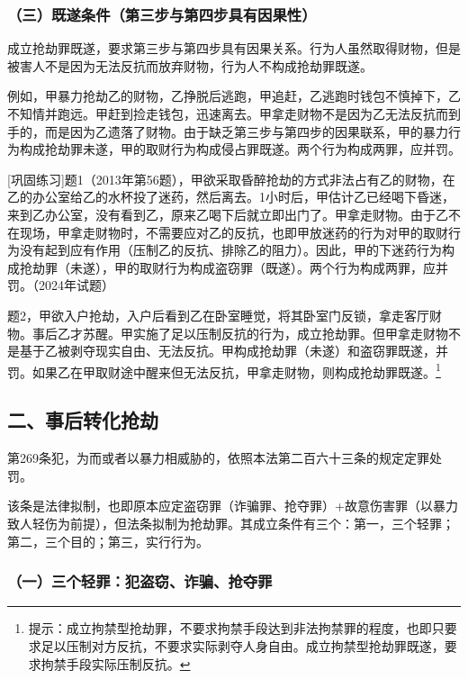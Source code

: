 \subsubsection*{（三）既遂条件（第三步与第四步具有因果性）}

成立抢劫罪既遂，要求第三步与第四步具有因果关系。行为人虽然取得财物，但是被害人不是因为无法反抗而放弃财物，行为人不构成抢劫罪既遂。

例如，甲暴力抢劫乙的财物，乙挣脱后逃跑，甲追赶，乙逃跑时钱包不慎掉下，乙不知情并跑远。甲赶到捡走钱包，迅速离去。甲拿走财物不是因为乙无法反抗而到手的，而是因为乙遗落了财物。由于缺乏第三步与第四步的因果联系，甲的暴力行为构成抢劫罪未遂，甲的取财行为构成侵占罪既遂。两个行为构成两罪，应并罚。

[巩固练习]题1（2013年第56题），甲欲采取昏醉抢劫的方式非法占有乙的财物，在乙的办公室给乙的水杯投了迷药，然后离去。1小时后，甲估计乙已经喝下昏迷，来到乙办公室，没有看到乙，原来乙喝下后就立即出门了。甲拿走财物。由于乙不在现场，甲拿走财物时，不需要应对乙的反抗，也即甲放迷药的行为对甲的取财行为没有起到应有作用（压制乙的反抗、排除乙的阻力）。因此，甲的下迷药行为构成抢劫罪（未遂），甲的取财行为构成盗窃罪（既遂）。两个行为构成两罪，应并罚。（2024年试题）

题2，甲欲入户抢劫，入户后看到乙在卧室睡觉，将其卧室门反锁，拿走客厅财物。事后乙才苏醒。甲实施了足以压制反抗的行为，成立抢劫罪。但甲拿走财物不是基于乙被剥夺现实自由、无法反抗。甲构成抢劫罪（未遂）和盗窃罪既遂，并罚。如果乙在甲取财途中醒来但无法反抗，甲拿走财物，则构成抢劫罪既遂。\footnote{提示：成立拘禁型抢劫罪，不要求拘禁手段达到非法拘禁罪的程度，也即只要求足以压制对方反抗，不要求实际剥夺人身自由。成立拘禁型抢劫罪既遂，要求拘禁手段实际压制反抗。}

\subsection*{二、事后转化抢劫}

第269条犯，为而或者以暴力相威胁的，依照本法第二百六十三条的规定定罪处罚。

该条是法律拟制，也即原本应定盗窃罪（诈骗罪、抢夺罪）+故意伤害罪（以暴力致人轻伤为前提），但法条拟制为抢劫罪。其成立条件有三个：第一，三个轻罪；第二，三个目的；第三，实行行为。

\subsubsection*{（一）三个轻罪：犯盗窃、诈骗、抢夺罪}

